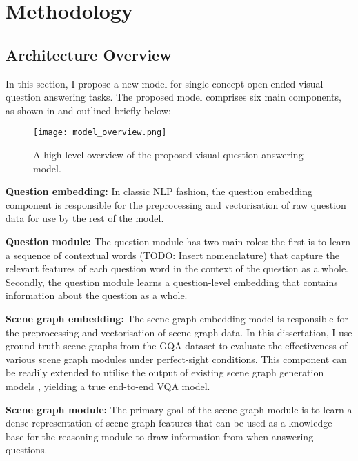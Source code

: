 \chapter{Methodology}
\label{chapter:methodology}

\section{Architecture Overview}
\label{section:architecture_overview}

In this section, I propose a new model for single-concept open-ended visual question answering tasks. The proposed model comprises six main components, as shown in \figureautorefname{ \ref{fig:model_overview}} and outlined briefly below:

\begin{figure}[htbp]
    \centering
    \texttt{[image: model\_overview.png]}
    \caption{A high-level overview of the proposed visual-question-answering model.}
    \label{fig:model_overview}
\end{figure}

\textbf{Question embedding:} In classic NLP fashion, the question embedding component is responsible for the preprocessing and vectorisation of raw question data for use by the rest of the model.

\textbf{Question module:} The question module has two main roles: the first is to learn a sequence of contextual words {\color{red}(TODO: Insert nomenclature)} that capture the relevant features of each question word in the context of the question as a whole. Secondly, the question module learns a question-level embedding that contains information about the question as a whole.

\textbf{Scene graph embedding:} The scene graph embedding model is responsible for the preprocessing and vectorisation of scene graph data. In this dissertation, I use ground-truth scene graphs from the GQA dataset to evaluate the effectiveness of various scene graph modules under perfect-sight conditions. This component can be readily extended to utilise the output of existing scene graph generation models \cite{yang2018graph, li2019relation}, yielding a true end-to-end VQA model.

\textbf{Scene graph module:} The primary goal of the scene graph module is to learn a dense representation of scene graph features that can be used as a knowledge-base for the reasoning module to draw information from when answering questions.

